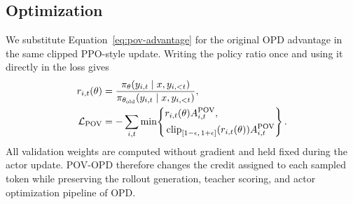 \subsection{Optimization}

We substitute Equation~\eqref{eq:pov-advantage} for the original OPD advantage in the same clipped PPO-style update. Writing the policy ratio once and using it directly in the loss gives
\begin{equation}
\begin{aligned}
r_{i,t}(\theta)
&=\frac{\pi_\theta(y_{i,t}\mid x,y_{i,<t})}
{\pi_{\theta_{\mathrm{old}}}(y_{i,t}\mid x,y_{i,<t})},\\
{\cal L}_{\mathrm{POV}}
&=-\sum_{i,t}\min\!\left\{
\begin{aligned}
&r_{i,t}(\theta)A^{\mathrm{POV}}_{i,t},\\
&\operatorname{clip}_{[1-\epsilon,\,1+\epsilon]}(r_{i,t}(\theta))
A^{\mathrm{POV}}_{i,t}
\end{aligned}
\right\}.
\end{aligned}
\label{eq:pov-objective}
\end{equation}
All validation weights are computed without gradient and held fixed during the actor update. POV-OPD therefore changes the credit assigned to each sampled token while preserving the rollout generation, teacher scoring, and actor optimization pipeline of OPD.
